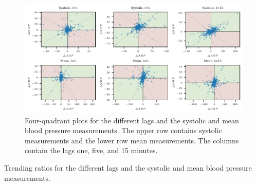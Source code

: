 \begin{figure}
    \centering
    \includegraphics{plots/mimic/plot_4q}
    \caption{Four-quadrant plots for the different lags and the systolic and mean blood pressure measurements. The upper row contains systolic measurements and the lower row mean measurements. The columns contain the lags one, five, and 15 minutes.}
    \label{fig:app-mimic-4q}
\end{figure}

\begin{table}
    \centering
    
    \caption{Trending ratios for the different lags and the systolic and mean blood pressure measurements.}
    \label{tab:app-mimic-trending-ratios}
\end{table}

